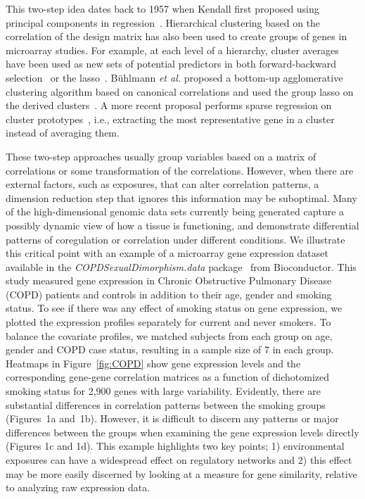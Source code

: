 This two-step idea dates back to 1957 when Kendall first proposed using principal components in regression~\citep{kendall1975multivariate}. Hierarchical clustering based on the correlation of the design matrix has also been used to create groups of genes in microarray studies. For example, at each level of a hierarchy, cluster averages have been used as new sets of potential predictors in both forward-backward selection~\citep{hastie2001supervised} or the lasso~\citep{park2007averaged}. B{\"u}hlmann \textit{et al.} proposed a bottom-up agglomerative clustering algorithm based on canonical correlations and used the group lasso on the derived clusters~\citep{buhlmann2013correlated}. A more recent proposal performs sparse regression on cluster prototypes~\citep{reid2016sparse}, i.e., extracting the most representative gene in a cluster instead of averaging them. 

These two-step approaches usually group variables based on a matrix of correlations or some transformation of the correlations. However, when there are external factors, such as exposures, that can alter correlation patterns, a dimension reduction step that ignores this information may be suboptimal. Many of the high-dimensional genomic data sets currently being generated  capture a possibly dynamic view of how a tissue is functioning, and demonstrate differential patterns of coregulation or correlation under different conditions. We illustrate this critical point with an example of a microarray gene expression dataset available in the \emph{COPDSexualDimorphism.data} package~\citep{copd} from Bioconductor. This study measured gene expression in Chronic Obstructive Pulmonary Disease (COPD) patients and controls in addition to their age, gender and smoking status. To see if there was any effect of smoking status on gene expression, we plotted the expression profiles separately for current and never smokers. To balance the covariate profiles, we matched subjects from each group on age, gender and COPD case status, resulting in a sample size of 7 in each group. Heatmaps in Figure~\ref{fig:COPD} show gene expression levels and the corresponding gene-gene correlation matrices as a function of dichotomized smoking status for 2,900 genes with large variability. Evidently, there are substantial differences in correlation patterns between the smoking groups (Figures~1a and~1b). However, it is difficult to discern any patterns or major differences between the groups when examining the gene expression levels directly (Figures 1c and 1d). This example highlights two key points; 1) environmental exposures can have a widespread effect on regulatory networks and 2) this effect may be more easily discerned by looking at a measure for gene similarity, relative to analyzing raw expression data.  



